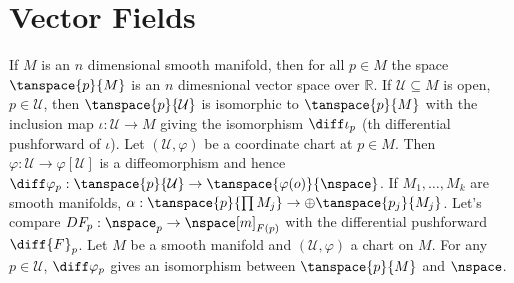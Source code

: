 \section{Vector Fields}
        If $M$ is an $n$ dimensional smooth manifold, then for all $p\in{M}$ the
        space $\tanspace{p}{M}$ is an $n$ dimesnional vector space over
        $\mathbb{R}$. If $\mathcal{U}\subseteq{M}$ is open, $p\in\mathcal{U}$,
        then $\tanspace{p}{\mathcal{U}}$ is isomorphic to $\tanspace{p}{M}$
        with the inclusion map $\iota:\mathcal{U}\rightarrow{M}$ giving the
        isomorphism $\diff\iota_{p}$ (th differential pushforward of $\iota$).
        Let $(\mathcal{U},\varphi)$ be a coordinate chart at $p\in{M}$. Then
        $\varphi:\mathcal{U}\rightarrow\varphi[\mathcal{U}]$ is a diffeomorphism
        and hence $\diff\varphi_{p}:\tanspace{p}{\mathcal{U}}\rightarrow%
        \tanspace{\varphi(o)}{\nspace}$. If $M_{1},\dots,M_{k}$ are smooth
        manifolds, $\alpha:\tanspace{p}{\prod{M}_{j}}\rightarrow\oplus%
        \tanspace{p_{j}}{M_{j}}$. Let's compare
        $DF_{p}:\nspace_{p}\rightarrow\nspace[m]_{F(p)}$ with the differential
        pushforward $\diff{F}_{p}$. Let $M$ be a smooth manifold and
        $(\mathcal{U},\varphi)$ a chart on $M$. For any $p\in\mathcal{U}$,
        $\diff\varphi_{p}$ gives an isomorphism between $\tanspace{p}{M}$
        and $\nspace$.
